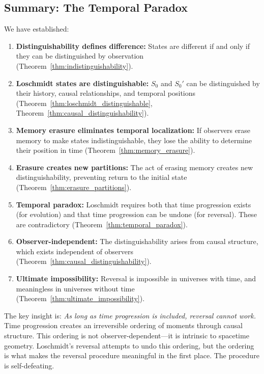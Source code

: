 \documentclass[twocolumn,10pt]{article}
\theoremstyle{definition}
\theoremstyle{remark}
\begin{document}
\subsection{Summary: The Temporal Paradox}

We have established:

\begin{enumerate}
\item \textbf{Distinguishability defines difference:} States are different if and only if they can be distinguished by observation (Theorem~\ref{thm:indistinguishability}).

\item \textbf{Loschmidt states are distinguishable:} $S_0$ and $S_0'$ can be distinguished by their history, causal relationships, and temporal positions (Theorem~\ref{thm:loschmidt_distinguishable}, Theorem~\ref{thm:causal_distinguishability}).

\item \textbf{Memory erasure eliminates temporal localization:} If observers erase memory to make states indistinguishable, they lose the ability to determine their position in time (Theorem~\ref{thm:memory_erasure}).

\item \textbf{Erasure creates new partitions:} The act of erasing memory creates new distinguishability, preventing return to the initial state (Theorem~\ref{thm:erasure_partitions}).

\item \textbf{Temporal paradox:} Loschmidt requires both that time progression exists (for evolution) and that time progression can be undone (for reversal). These are contradictory (Theorem~\ref{thm:temporal_paradox}).

\item \textbf{Observer-independent:} The distinguishability arises from causal structure, which exists independent of observers (Theorem~\ref{thm:causal_distinguishability}).

\item \textbf{Ultimate impossibility:} Reversal is impossible in universes with time, and meaningless in universes without time (Theorem~\ref{thm:ultimate_impossibility}).
\end{enumerate}

\noindent The key insight is: \textit{As long as time progression is included, reversal cannot work.} Time progression creates an irreversible ordering of moments through causal structure. This ordering is not observer-dependent—it is intrinsic to spacetime geometry. Loschmidt's reversal attempts to undo this ordering, but the ordering is what makes the reversal procedure meaningful in the first place. The procedure is self-defeating.
\end{document}
